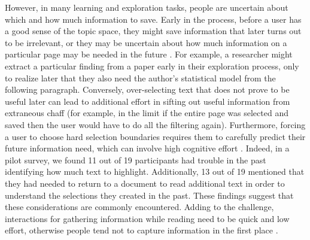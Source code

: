 




However, in many learning and exploration tasks, people are uncertain about which and how much information to save. Early in the process, before a user has a good sense of the topic space, they might save information that later turns out to be irrelevant, or they may be uncertain about how much information on a particular page may be needed in the future \cite{kittur2013costs}. For example, a researcher might extract a particular finding from a paper early in their exploration process, only to realize later that they also need the author's statistical model from the following paragraph. Conversely, over-selecting text that does not prove to be useful later can lead to additional effort in sifting out useful information from extraneous chaff (for example, in the limit if the entire page was selected and saved then the user would have to do all the filtering again). Furthermore, forcing a user to choose hard selection boundaries requires them to carefully predict their future information need, which can involve high cognitive effort \cite{sinha2005cognitive}. Indeed, in a pilot survey, we found 11 out of 19 participants had trouble in the past identifying how much text to highlight. Additionally, 13 out of 19 mentioned that they had needed to return to a document to read additional text in order to understand the selections they created in the past. These findings suggest that these considerations are commonly encountered. Adding to the challenge, interactions for gathering information while reading need to be quick and low effort, otherwise people tend not to capture information in the first place \cite{marshall2005saving,tashman2011liquidtext,hinckley2012informal}. 

